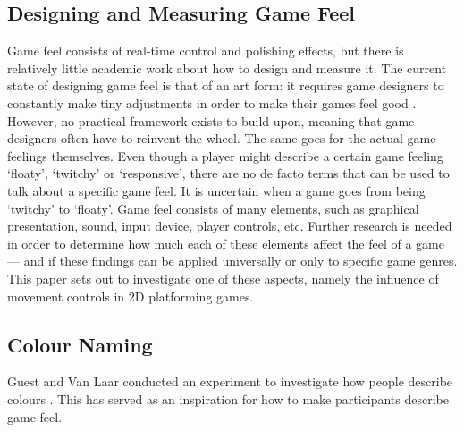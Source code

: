 \subsection{Designing and Measuring Game Feel}
Game feel consists of real-time control and polishing effects, but there is relatively little academic work about how to design and measure it. The current state of designing game feel is that of an art form: it requires game designers to constantly make tiny adjustments in order to make their games feel good \cite{meatboy1, meatboy2, juicyBeast, gameFeelTips}. However, no practical framework exists to build upon, meaning that game designers often have to reinvent the wheel. The same goes for the actual game feelings themselves. Even though a player might describe a certain game feeling `floaty', `twitchy' or `responsive', there are no de facto terms that can be used to talk about a specific game feel. It is uncertain when a game goes from being `twitchy' to `floaty'. Game feel consists of many elements, such as graphical presentation, sound, input device, player controls, etc. Further research is needed in order to determine how much each of these elements affect the feel of a game --- and if these findings can be applied universally or only to specific game genres. This paper sets out to investigate one of these aspects, namely the influence of movement controls in 2D platforming games.

\subsection{Colour Naming} \label{colour}
Guest and Van Laar conducted an experiment to investigate how people describe colours \cite{guest_structure_2000}. This has served as an inspiration for how to make participants describe game feel.

